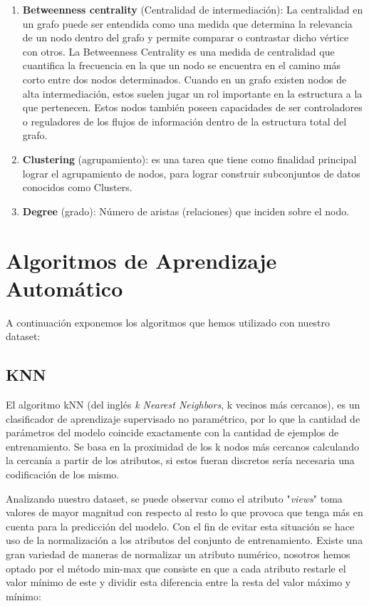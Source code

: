 \documentclass[conference,a4paper]{IEEEtran}
\begin{document}
\begin{enumerate}
\item\textbf{Betweenness centrality} (Centralidad de intermediación): La centralidad en un grafo puede ser entendida como una medida que determina la relevancia de un nodo dentro del grafo y permite comparar o contrastar dicho vértice con otros. La Betweenness Centrality es una medida de centralidad que cuantifica la frecuencia en la que un nodo se encuentra en el camino más corto entre dos nodos determinados. Cuando en un grafo existen nodos de alta intermediación, estos suelen jugar un rol importante en la estructura a la que pertenecen. Estos nodos también poseen capacidades de ser controladores o reguladores de los flujos de información dentro de la estructura total del grafo. 
\item\textbf{Clustering} (agrupamiento): es una tarea que tiene como finalidad principal lograr el agrupamiento de nodos, para lograr construir subconjuntos de datos conocidos como Clusters.
\item\textbf{Degree} (grado): Número de aristas (relaciones) que inciden sobre el nodo.
\end{enumerate}
 
\section{Algoritmos de Aprendizaje Automático}
A continuación exponemos los algoritmos que hemos utilizado con nuestro dataset:

\subsection{KNN}
El algoritmo kNN (del inglés \emph{k Nearest Neighbors}, k vecinos más cercanos), es un clasificador de aprendizaje supervisado no paramétrico, por lo que la cantidad de parámetros del modelo coincide exactamente con la cantidad de ejemplos de entrenamiento. Se basa en la proximidad de los k nodos más cercanos calculando la cercanía a partir de los atributos, si estos fueran discretos sería necesaria una codificación de los mismo. 

Analizando nuestro dataset, se puede observar como el atributo "\emph{views}" toma valores de mayor magnitud con respecto al resto lo que provoca que tenga más en cuenta para la predicción del modelo. Con el fin de evitar esta situación se hace uso de la normalización a los atributos del conjunto de entrenamiento. Existe una gran variedad de maneras de normalizar un atributo numérico, nosotros hemos optado por el método min-max \cite{b1} que consiste en que a cada atributo restarle el valor mínimo de este y dividir esta diferencia entre la resta del valor máximo y mínimo: 
\end{document}
